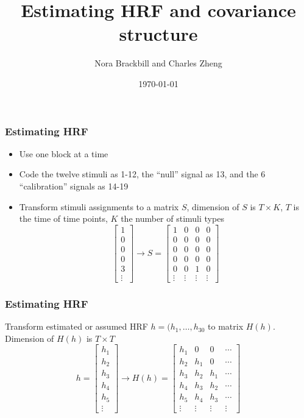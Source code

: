 \documentclass{beamer}
\title[Exercise 2]{Estimating HRF and covariance structure}
\author{Nora Brackbill and Charles Zheng} %
\institute[Stanford] %
{Stanford University}
\date{\today} %
\begin{document}
\begin{frame}
\titlepage %
\end{frame}


\begin{frame}
\frametitle{Estimating HRF}
\begin{itemize}
\item Use one block at a time
\item Code the twelve stimuli as 1-12, the ``null'' signal as 13, and the 6 ``calibration'' signals as 14-19
\item Transform stimuli assignments to a matrix $S$,
dimension of $S$ is $T \times K$, $T$ is the time of time points, $K$ the number of stimuli types
\[
\begin{bmatrix}
1\\0\\0\\0\\3\\\vdots
\end{bmatrix} \rightarrow
S = 
\begin{bmatrix}
1 & 0 & 0 & 0\\
0 & 0 & 0 & 0\\
0 & 0 & 0 & 0\\
0 & 0 & 0 & 0\\
0 & 0 & 1 & 0\\
\vdots & \vdots & \vdots & \vdots
\end{bmatrix}
\]
\end{itemize}
\end{frame}


\begin{frame}
\frametitle{Estimating HRF}
Transform estimated or assumed HRF $h = (h_1,\hdots,h_{30}$ to matrix $H(h)$.
Dimension of $H(h)$ is $T \times T$
\[
h = 
\begin{bmatrix}
h_1\\h_2\\h_3\\h_4\\h_5\\\vdots
\end{bmatrix} \rightarrow
H(h) = 
\begin{bmatrix}
h_1 & 0 & 0 & \cdots\\
h_2 & h_1 & 0 & \cdots\\
h_3 & h_2 & h_1 & \cdots\\
h_4 & h_3 & h_2 & \cdots\\
h_5 & h_4 & h_3 & \cdots\\
\vdots & \vdots & \vdots & \vdots
\end{bmatrix}
\]

\end{frame}
\end{document}
